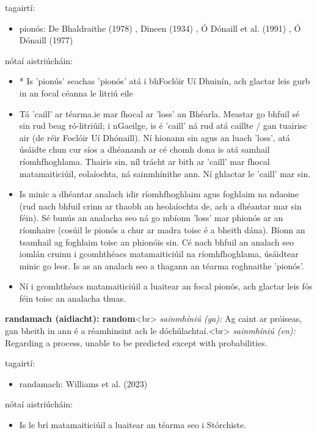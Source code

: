 \documentclass{article}
\begin{document}
tagairtí:
\begin{itemize}
	\item pionós: De Bhaldraithe (1978) \cite{de-bhaldraithe}, Dineen (1934) \cite{dineen}, Ó Dónaill et al. (1991) \cite{focloir-beag}, Ó Dónaill (1977) \cite{odonaill}
\end{itemize}

nótaí aistriúcháin:
\begin{itemize}
	\item * Is 'pionús' seachas 'pionós' atá i bhFoclóir Uí Dhuinín, ach glactar leis gurb in an focal céanna le litriú eile
	\item Tá 'caill' ar téarma.ie mar fhocal ar 'loss' an Bhéarla. Meastar go bhfuil sé sin rud beag ró-litriúil; i nGaeilge, is é 'caill' ná rud atá caillte / gan tuairisc air (de réir Foclóir Uí Dhónaill). Ní hionann sin agus an luach 'loss', atá úsáidte chun cur síos a dhéanamh ar cé chomh dona is atá samhail ríomhfhoghlama. Thairis sin, níl trácht ar bith ar 'caill' mar fhocal matamaiticiúil, eolaíochta, ná sainmhínithe ann. Ní ghlactar le 'caill' mar sin.
	\item Is minic a dhéantar analach idir ríomhfhoghlaim agus foghlaim na ndaoine (rud nach bhfuil crinn ar thaobh an heolaíochta de, ach a dhéantar mar sin féin). Sé bunús an analacha seo ná go mbíonn 'loss' mar phionós ar an ríomhaire (cosúil le pionós a chur ar madra toisc é a bheith dána). Bíonn an tsamhail ag foghlaim toisc an phionóis sin. Cé nach bhfuil an analach seo iomlán cruinn i gcomhthéacs matamaiticiúil na ríomhfhoghlama, úsáidtear minic go leor. Is as an analach seo a thagann an téarma roghnaithe 'pionós'.
	\item Ní i gcomhthéacs matamaiticiúil a luaitear an focal pionós, ach glactar leis fós féin toisc an analacha thuas.
\end{itemize}


\textbf{randamach (aidiacht): random}<br>
\textit{sainmhíniú (ga):} Ag caint ar próiseas, gan bheith in ann é a réamhinsint ach le dóchúlachtaí.<br>
\textit{sainmhíniú (en):} Regarding a process, unable to be predicted except with probabilities.

tagairtí:
\begin{itemize}
	\item randamach: Williams et al. (2023) \cite{storchiste}
\end{itemize}

nótaí aistriúcháin:
\begin{itemize}
	\item Is le brí matamaiticiúil a luaitear an téarma seo i Stórchiste.
\end{itemize}
\end{document}
